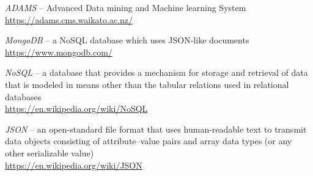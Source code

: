 %

\begin{thebibliography}{999}

		\textit{ADAMS} -- Advanced Data mining and Machine learning System \\
		\url{https://adams.cms.waikato.ac.nz/}{}
		
		\textit{MongoDB} -- a NoSQL database which uses JSON-like documents \\
		\url{https://www.mongodb.com/}{}

		\textit{NoSQL} -- a database that provides a mechanism for storage
		and retrieval of data that is modeled in means other than the tabular
		relations used in relational databases \\
		\url{https://en.wikipedia.org/wiki/NoSQL}{}

		\textit{JSON} -- an open-standard file format that uses human-readable
		text to transmit data objects consisting of attribute–value pairs
		and array data types (or any other serializable value) \\
		\url{https://en.wikipedia.org/wiki/JSON}{}

\end{thebibliography}
